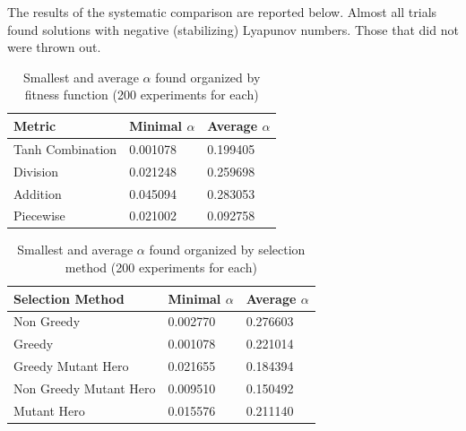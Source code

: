 \documentclass[12pt]{article}
\begin{document}
\clearpage

The results of the systematic comparison are reported below.  Almost all
trials found solutions with negative (stabilizing) Lyapunov numbers.  Those
that did not were thrown out.

\begin{table}[ht]
\centering
\caption{Smallest and average $\alpha$ found organized by fitness function (200 experiments for each)}
\begin{tabular}{|p{5cm}|p{2cm}|p{2cm}|}
\hline
Metric & Minimal $\alpha$ & Average $\alpha$ \\
\hline
\hline
Tanh Combination & 0.001078 & 0.199405 \\
\hline
Division  & 0.021248 & 0.259698 \\
\hline
Addition  & 0.045094 & 0.283053 \\
\hline
Piecewise & 0.021002 & 0.092758 \\
\hline
\end{tabular}
\end{table}

\begin{table}[ht]
\centering
\caption{Smallest and average $\alpha$ found organized by selection method (200 experiments for each)}
\begin{tabular}{|p{5cm}|p{2.0cm}|p{2.0cm}|}
\hline
Selection Method & Minimal $\alpha$ & Average $\alpha$ \\
\hline
\hline
Non Greedy & 0.002770 & 0.276603 \\
\hline
Greedy & 0.001078 & 0.221014 \\
\hline
Greedy Mutant Hero & 0.021655 & 0.184394 \\
\hline
Non Greedy Mutant Hero & 0.009510 & 0.150492 \\
\hline
Mutant Hero & 0.015576 & 0.211140 \\
\hline
\end{tabular}
\end{table}
\end{document}
